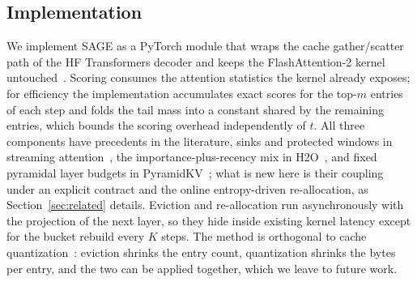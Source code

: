 \begin{algorithm}[t]
\SetAlgoLined
{}
\caption{One decoding step of SAGE.}
\label{alg:sage}
\end{algorithm}

\subsection{Implementation}\label{sec:method_impl}

We implement SAGE as a PyTorch module that wraps the cache
gather/scatter path of the HF Transformers decoder and keeps the
FlashAttention-2 kernel untouched~\cite{dao2023flashattention2}.
Scoring consumes the attention statistics the kernel already exposes;
for efficiency the implementation accumulates exact scores for the
top-$m$ entries of each step and folds the tail mass into a constant
shared by the remaining entries, which bounds the scoring overhead
independently of $t$. All three components have precedents in the
literature, sinks and protected windows in streaming
attention~\cite{xiao2023efficient}, the importance-plus-recency mix in
H2O~\cite{zhang2023h2o}, and fixed pyramidal layer budgets in
PyramidKV~\cite{zhang2024pyramidkv}; what is new here is their coupling
under an explicit contract and the online entropy-driven
re-allocation, as Section~\ref{sec:related} details. Eviction and
re-allocation run asynchronously with the projection of the next layer,
so they hide inside existing kernel latency except for the bucket
rebuild every $K$ steps. The method is orthogonal to cache
quantization~\cite{liu2024kivi}: eviction shrinks the entry count,
quantization shrinks the bytes per entry, and the two can be applied
together, which we leave to future work.
